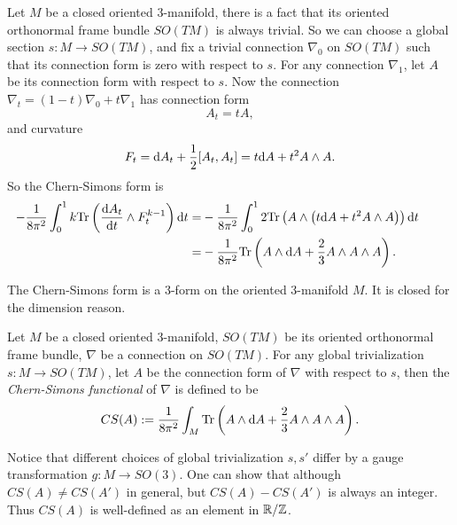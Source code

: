 Let $M$ be a closed oriented 3-manifold, 
there is a fact that its oriented orthonormal frame bundle $SO(TM)$ is always trivial. 
So we can choose a global section $s: M \to SO(TM)$, 
and fix a trivial connection $\nabla_0$ on $SO(TM)$ such that 
its connection form is zero with respect to $s$. For any connection $\nabla_1$, 
let $A$ be its connection form with respect to $s$. 
Now the connection $\nabla_t = (1-t)\nabla_0 + t\nabla_1$ has connection form 
\begin{equation*}
    A_t = tA, 
\end{equation*}
and curvature
\begin{equation*}
    F_t = {\rm d} A_t + \frac{1}{2}[A_t, A_t] =
    t\mathrm{d}A + t^2 A \wedge A.
\end{equation*}
So the Chern-Simons form is
\begin{align}\label{equ:CS-form}
    -\frac{1}{8\pi^2}\int_0^1 k{\rm Tr}\left(\frac{\mathrm{d} A_t}{\mathrm{d} t}\wedge F_t^{k-1}\right) {\rm d} t 
    =& -\frac{1}{8\pi^2}\int_0^1 2{\rm Tr}\left(A \wedge\left(t\mathrm{d}A + t^2 A \wedge A\right)\right) {\rm d} t \tag*{} \\ 
    =& -\frac{1}{8\pi^2}{\rm Tr}\left(A \wedge \mathrm{d}A + \frac{2}{3}A \wedge A \wedge A\right).
\end{align}
\begin{remark}
    The Chern-Simons form is a 3-form on the oriented 3-manifold $M$. 
    It is closed for the dimension reason. 
\end{remark}
\begin{definition}
    Let $M$ be a closed oriented 3-manifold, 
    $SO(TM)$ be its oriented orthonormal frame bundle, 
    $\nabla$ be a connection on $SO(TM)$. 
    For any global trivialization $s: M \to SO(TM)$,
    let $A$ be the connection form of $\nabla$ with respect to $s$, 
    then the \emph{Chern-Simons functional} of $\nabla$ is defined to be 
    \begin{equation*}
        CS(A) := \frac{1}{8\pi^2}\int_M {\rm Tr}\left(A \wedge \mathrm{d}A + \frac{2}{3}A \wedge A \wedge A\right).
    \end{equation*}
\end{definition}
\begin{remark}
    Notice that different choices of global trivialization $s,s'$ differ by a gauge transformation $g: M \to SO(3)$.
    One can show that although $CS(A)\neq CS(A')$ in general, but $CS(A) - CS(A')$ is always an integer. 
    Thus $CS(A)$ is well-defined as an element in $\mathbb{R}/\mathbb{Z}$. 
\end{remark}

